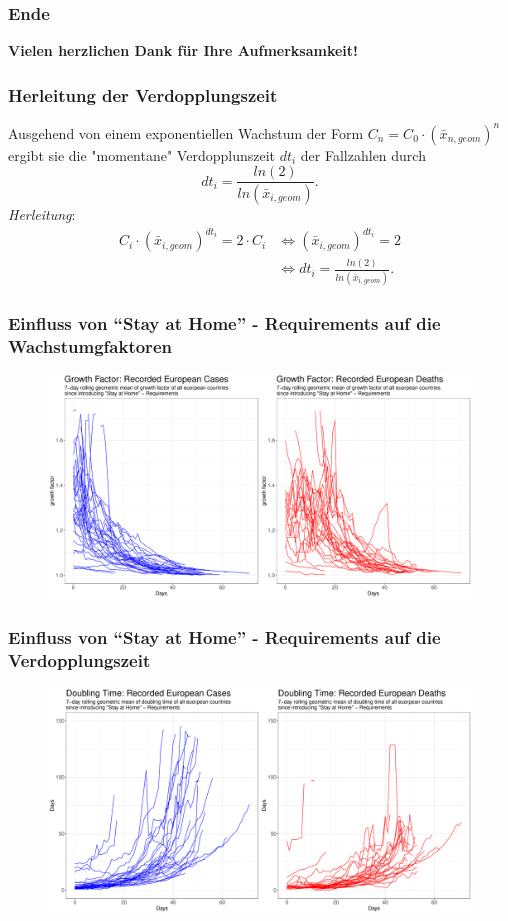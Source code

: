 \documentclass{beamer}
\begin{document}
\begin{frame}
	\frametitle{Ende}
		\centering
		\textbf{Vielen herzlichen Dank für Ihre Aufmerksamkeit!}
\end{frame}
 
\begin{frame}
	\frametitle{Herleitung der Verdopplungszeit}
	Ausgehend von einem exponentiellen Wachstum der Form $C_n = C_0 \cdot (\bar{x}_{n, geom})^{n}$ ergibt sie die "momentane" Verdopplunszeit $dt_i$ der Fallzahlen durch $$dt_i = \frac{ln(2)}{ln(\bar{x}_{i, geom})}.$$
	\emph{Herleitung}: 
	\begin{align*} C_i \cdot (\bar{x}_{i, geom})^{dt_i} = 2 \cdot C_i 
		 &\iff (\bar{x}_{i, geom})^{dt_i} = 2 \\
	 	&\iff dt_i = \frac{ln(2)}{ln(\bar{x}_{i, geom})}.
	\end{align*}
\end{frame}

\begin{frame}
 	\frametitle{Einfluss von ``Stay at Home'' - Requirements auf die Wachstumgfaktoren}
	\begin{figure}
		\centering
		\includegraphics[width = 350pt]{plot_c6_gf.pdf}
	\end{figure}
 \end{frame}

 \begin{frame}
 	\frametitle{Einfluss von ``Stay at Home'' - Requirements auf die Verdopplungszeit}
	\begin{figure}
		\centering
		\includegraphics[width = 350pt]{plot_c6_dt.pdf}
	\end{figure}
 \end{frame}
\end{document}
